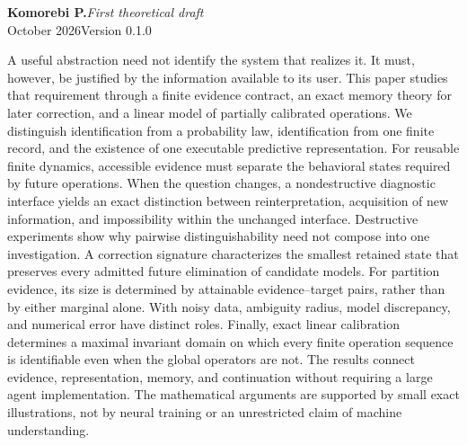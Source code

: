 \documentclass[11pt,letterpaper]{article}
\theoremstyle{plain}
\theoremstyle{definition}
\begin{document}
\hypersetup{pageanchor=false}
\begin{titlepage}\thispagestyle{empty}
\vspace*{.25in}
\par
\vspace{.65in}
\vspace{.20in}
\vspace{.28in}\noindent{\color{ink}\rule{\textwidth}{.85pt}}\par
\vspace{.16in}
\noindent\textbf{Komorebi P.}\hfill\textit{First theoretical draft}\\
 October 2026\hfill Version 0.1.0\par
\vspace{.46in}
\par\smallskip
\noindent A useful abstraction need not identify the system that realizes it. It must, however, be justified by the information available to its user. This paper studies that requirement through a finite evidence contract, an exact memory theory for later correction, and a linear model of partially calibrated operations. We distinguish identification from a probability law, identification from one finite record, and the existence of one executable predictive representation. For reusable finite dynamics, accessible evidence must separate the behavioral states required by future operations. When the question changes, a nondestructive diagnostic interface yields an exact distinction between reinterpretation, acquisition of new information, and impossibility within the unchanged interface. Destructive experiments show why pairwise distinguishability need not compose into one investigation. A correction signature characterizes the smallest retained state that preserves every admitted future elimination of candidate models. For partition evidence, its size is determined by attainable evidence--target pairs, rather than by either marginal alone. With noisy data, ambiguity radius, model discrepancy, and numerical error have distinct roles. Finally, exact linear calibration determines a maximal invariant domain on which every finite operation sequence is identifiable even when the global operators are not. The results connect evidence, representation, memory, and continuation without requiring a large agent implementation. The mathematical arguments are supported by small exact illustrations, not by neural training or an unrestricted claim of machine understanding.

\end{titlepage}
\end{document}
